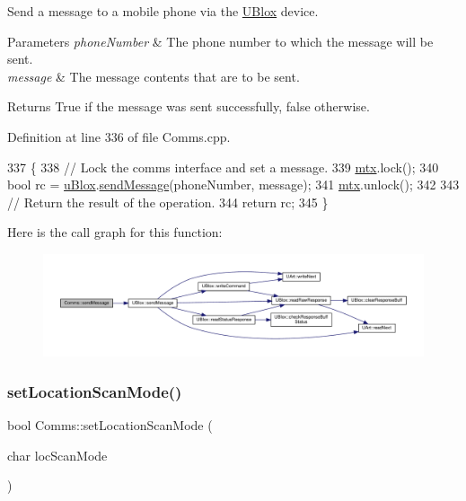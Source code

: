 Send a message to a mobile phone via the \hyperlink{class_u_blox}{U\+Blox} device.


\begin{DoxyParams}{Parameters}
{\em phone\+Number} & The phone number to which the message will be sent. \\
\hline
{\em message} & The message contents that are to be sent. \\
\hline
\end{DoxyParams}
\begin{DoxyReturn}{Returns}
True if the message was sent successfully, false otherwise. 
\end{DoxyReturn}


Definition at line 336 of file Comms.\+cpp.


\begin{DoxyCode}
337 \{
338     \textcolor{comment}{// Lock the comms interface and set a message.}
339     \hyperlink{class_comms_a21df861b1202573e4cd0cb5666d638fe}{mtx}.lock();
340     \textcolor{keywordtype}{bool} rc = \hyperlink{class_comms_ac64dea134b116147e5441172346dbd6c}{uBlox}.\hyperlink{class_u_blox_a946f2903bb01a62cd5bdef423eaa9750}{sendMessage}(phoneNumber, message);
341     \hyperlink{class_comms_a21df861b1202573e4cd0cb5666d638fe}{mtx}.unlock();
342 
343     \textcolor{comment}{// Return the result of the operation.}
344     \textcolor{keywordflow}{return} rc;
345 \}
\end{DoxyCode}
Here is the call graph for this function\+:\nopagebreak
\begin{figure}[H]
\begin{center}
\leavevmode
\includegraphics[width=350pt]{d8/dcc/class_comms_ad28b072a0852ac95aa2475324cbfae60_cgraph}
\end{center}
\end{figure}
\mbox{\label{class_comms_a73c0cd58db7daf118bd0b1726fc9dded}} 
\subsubsection{\texorpdfstring{set\+Location\+Scan\+Mode()}{setLocationScanMode()}}
{\footnotesize\ttfamily bool Comms\+::set\+Location\+Scan\+Mode (\begin{DoxyParamCaption}\item[{char}]{loc\+Scan\+Mode }\end{DoxyParamCaption})}

